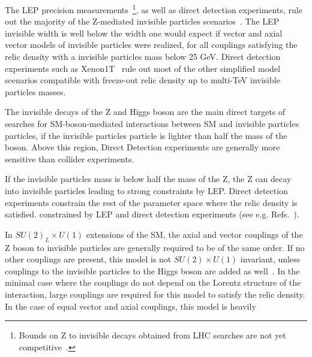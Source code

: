 The LEP precision measurements~\footnote{Bounds on Z to invisible decays obtained from LHC searches are not yet competitive~\cite{deSimone:2014pda}.}, as well as direct detection experiments, rule out the majority of the Z-mediated invisible particles scenarios~\cite{Arcadi:2014lta,Escudero:2016gzx}. The LEP invisible width is well below the width one would expect if vector and axial vector models of invisible particles were realized, for all couplings satisfying the relic density with a invisible particles mass below 25 GeV. Direct detection experiments such as Xenon1T~\cite{Aprile:2017iyp} 
rule out most of the other simplified model scenarios compatible with freeze-out relic density up to multi-TeV invisible particles masses. 


The invisible decays of the Z and Higgs boson are the main direct targets of searches for SM-boson-mediated interactions between SM and invisible particles particles, if the invisible particles particle is lighter than half the mass of the boson. Above this region, Direct Detection experiments are generally more sensitive than collider experiments. 


If the invisible particles mass is below half the mass of the Z, the Z can decay into invisible particles leading to strong constraints by LEP. Direct detection experiments constrain the rest of the parameter space 
where the relic density is satisfied. 
constrained by LEP and direct detection experiments (see e.g. Refs.~\cite{Arcadi:2014lta,Escudero:2016gzx}).

In $SU(2)_L \times U(1)$ extensions of the SM, the axial and vector couplings of the Z boson to invisible particles are generally required to be of the same order. If no other couplings are present, this model is not $SU(2) \times U(1)$ invariant, unless couplings to the invisible particles to the Higgs boson are added as well~\cite{Kahlhoefer:2015bea}. 
In the minimal case where the couplings do not depend on the Lorentz structure of the interaction, 
large couplings are required for this model to satisfy the relic density. 
In the case of equal vector and axial couplings, this model is heavily 


